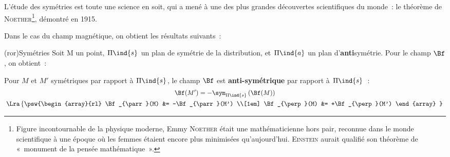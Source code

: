 \documentclass[../../main/main.tex]{subfiles}
\begin{document}
L'étude des symétries est toute une science en soit, qui a mené à une des plus
grandes découvertes scientifiques du monde~: le théorème de
\textsc{Noether}\footnote{Figure incontournable de la physique moderne, Emmy
  \textsc{Noether} était une mathématicienne hors pair, reconnue dans le monde
  scientifique à une époque où les femmes étaient encore plus minimisées
  qu'aujourd'hui. \textsc{Einstein} aurait qualifié son théorème de «~monument
de la pensée mathématique~».}, démontré en 1915.

Dans le cas du champ magnétique, on obtient les résultats suivants~:

\begin{tcb*}(ror){Symétries}
	Soit M un point, $\Pi\ind{s}$ un plan de symétrie de la distribution, et
	$\Pi\ind{a}$ un plan d'\textbf{anti}symétrie. Pour le champ $\Bf$, on
  obtient~:
  \smallbreak
  \begin{isd}[sidebyside align=top]
    Pour $M$ et $M'$ symétriques par rapport à $\Pi\ind{s}$, le champ $\Bf$ est
    \textbf{anti-symétrique} par rapport à $\Pi\ind{s}$~:
    \begin{gather*}
      \Bf(M') = -\sym_{\Pi\ind{s}} \left(\Bf(M)\right)
      \\\Lra
      \left\{ 
        \psw{%
                  \begin{array}{rl}
                  \Bf_{\parr}(M) &= -\Bf_{\parr}(M')
                  \\[1em]
                  \Bf_{\perp}(M) &= +\Bf_{\perp}(M')
                \end{array}
        }%
       \right.
    \end{gather*}
    \begin{center}
\end{center}
\end{isd}
\end{tcb*}
\end{document}

